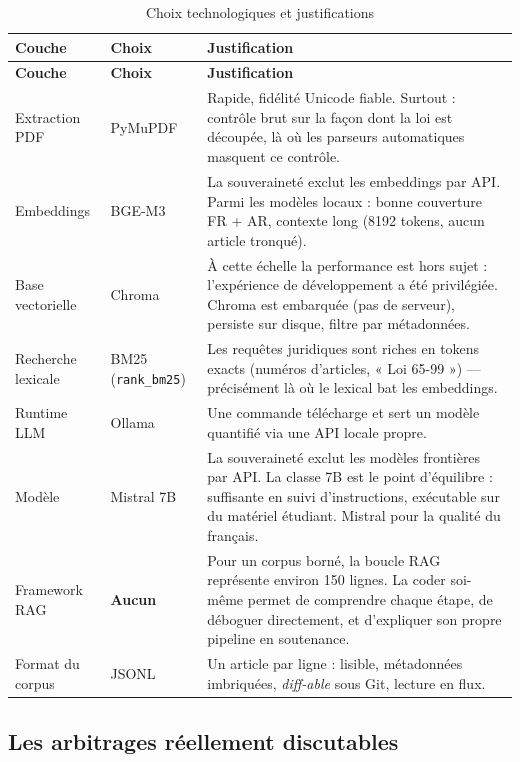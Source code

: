 \begin{longtable}[c]{| m{2.6cm} | m{3.1cm} | m{8.4cm} |}
\caption{Choix technologiques et justifications}\label{tab:techno}\\
\hline
\textbf{Couche} & \textbf{Choix} & \textbf{Justification} \\
\hline
\endfirsthead
\hline
\textbf{Couche} & \textbf{Choix} & \textbf{Justification} \\
\hline
\endhead
Extraction PDF & PyMuPDF & Rapide, fidélité Unicode fiable. Surtout : contrôle brut sur la façon dont la loi est découpée, là où les parseurs automatiques masquent ce contrôle. \\
\hline
Embeddings & BGE-M3 & La souveraineté exclut les embeddings par API. Parmi les modèles locaux : bonne couverture FR + AR, contexte long (8192 tokens, aucun article tronqué). \\
\hline
Base vectorielle & Chroma & À cette échelle la performance est hors sujet : l'expérience de développement a été privilégiée. Chroma est embarquée (pas de serveur), persiste sur disque, filtre par métadonnées. \\
\hline
Recherche lexicale & BM25 (\texttt{rank\_bm25}) & Les requêtes juridiques sont riches en tokens exacts (numéros d'articles, « Loi 65-99 ») --- précisément là où le lexical bat les embeddings. \\
\hline
Runtime LLM & Ollama & Une commande télécharge et sert un modèle quantifié via une API locale propre. \\
\hline
Modèle & Mistral 7B & La souveraineté exclut les modèles frontières par API. La classe 7B est le point d'équilibre : suffisante en suivi d'instructions, exécutable sur du matériel étudiant. Mistral pour la qualité du français. \\
\hline
Framework RAG & \textbf{Aucun} & Pour un corpus borné, la boucle RAG représente environ 150 lignes. La coder soi-même permet de comprendre chaque étape, de déboguer directement, et d'expliquer son propre pipeline en soutenance. \\
\hline
Format du corpus & JSONL & Un article par ligne : lisible, métadonnées imbriquées, \emph{diff-able} sous Git, lecture en flux. \\
\hline
\end{longtable}

\subsection{Les arbitrages réellement discutables}

